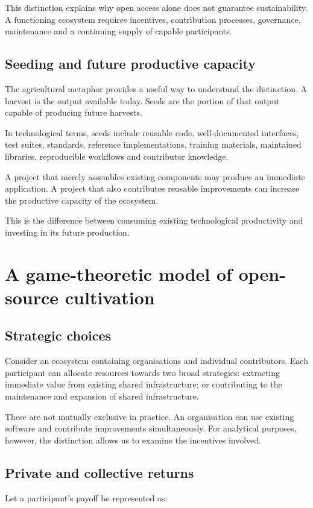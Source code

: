 \documentclass[11pt,a4paper]{article}
\begin{document}
This distinction explains why open access alone does not guarantee sustainability. A functioning ecosystem requires incentives, contribution processes, governance, maintenance and a continuing supply of capable participants.

\subsection{Seeding and future productive capacity}
The agricultural metaphor provides a useful way to understand the distinction. A harvest is the output available today. Seeds are the portion of that output capable of producing future harvests.

In technological terms, seeds include reusable code, well-documented interfaces, test suites, standards, reference implementations, training materials, maintained libraries, reproducible workflows and contributor knowledge.

A project that merely assembles existing components may produce an immediate application. A project that also contributes reusable improvements can increase the productive capacity of the ecosystem.

This is the difference between consuming existing technological productivity and investing in its future production.

\section{A game-theoretic model of open-source cultivation}
\subsection{Strategic choices}
Consider an ecosystem containing organisations and individual contributors. Each participant can allocate resources towards two broad strategies: extracting immediate value from existing shared infrastructure; or contributing to the maintenance and expansion of shared infrastructure.

These are not mutually exclusive in practice. An organisation can use existing software and contribute improvements simultaneously. For analytical purposes, however, the distinction allows us to examine the incentives involved.

\subsection{Private and collective returns}
Let a participant's payoff be represented as:
\end{document}
